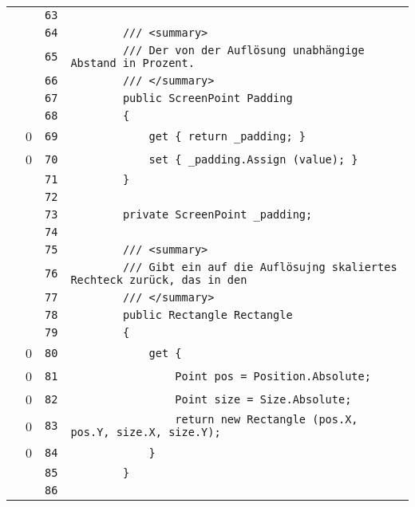 \documentclass[a4paper,10pt]{article}
\begin{document}
\begin{longtable}[l]{lrrl}
\cellcolor{gray} &  & \verb~63~ & \verb~~\\
\cellcolor{gray} &  & \verb~64~ & \verb~        /// <summary>~\\
\cellcolor{gray} &  & \verb~65~ & \verb~        /// Der von der Auflösung unabhängige Abstand in Prozent.~\\
\cellcolor{gray} &  & \verb~66~ & \verb~        /// </summary>~\\
\cellcolor{gray} &  & \verb~67~ & \verb~        public ScreenPoint Padding~\\
\cellcolor{gray} &  & \verb~68~ & \verb~        {~\\
\cellcolor{red} & 0 & \verb~69~ & \verb~            get { return _padding; }~\\
\cellcolor{red} & 0 & \verb~70~ & \verb~            set { _padding.Assign (value); }~\\
\cellcolor{gray} &  & \verb~71~ & \verb~        }~\\
\cellcolor{gray} &  & \verb~72~ & \verb~~\\
\cellcolor{gray} &  & \verb~73~ & \verb~        private ScreenPoint _padding;~\\
\cellcolor{gray} &  & \verb~74~ & \verb~~\\
\cellcolor{gray} &  & \verb~75~ & \verb~        /// <summary>~\\
\cellcolor{gray} &  & \verb~76~ & \verb~        /// Gibt ein auf die Auflösujng skaliertes Rechteck zurück, das in den~\\
\cellcolor{gray} &  & \verb~77~ & \verb~        /// </summary>~\\
\cellcolor{gray} &  & \verb~78~ & \verb~        public Rectangle Rectangle~\\
\cellcolor{gray} &  & \verb~79~ & \verb~        {~\\
\cellcolor{red} & 0 & \verb~80~ & \verb~            get {~\\
\cellcolor{red} & 0 & \verb~81~ & \verb~                Point pos = Position.Absolute;~\\
\cellcolor{red} & 0 & \verb~82~ & \verb~                Point size = Size.Absolute;~\\
\cellcolor{red} & 0 & \verb~83~ & \verb~                return new Rectangle (pos.X, pos.Y, size.X, size.Y);~\\
\cellcolor{red} & 0 & \verb~84~ & \verb~            }~\\
\cellcolor{gray} &  & \verb~85~ & \verb~        }~\\
\cellcolor{gray} &  & \verb~86~ & \verb~~\\

\end{longtable}
\end{document}
